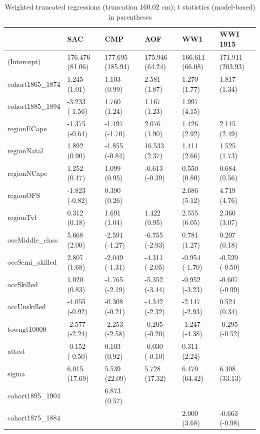 \begin{table}

\caption{Weighted truncated regressions (truncation 160.02 cm); t statistics (model-based) in parentheses}
\centering
\begin{tabular}[t]{llllll}
\toprule
 & SAC & CMP & AOF & WW1 & WWI 1915\\
\midrule
(Intercept) & 176.476 (81.06) & 177.695 (185.94) & 175.946 (64.24) & 166.611 (66.08) & 171.911 (203.93)\\
cohort1865\_1874 & 1.245 (1.01) & 1.103 (0.99) & 2.581 (1.87) & 1.270 (1.77) & 1.817 (1.34)\\
cohort1885\_1894 & -3.233 (-1.56) & 1.760 (1.24) & 1.167 (1.23) & 1.997 (4.15) & \\
regionECape & -1.375 (-0.64) & -1.497 (-1.70) & 2.076 (1.90) & 1.426 (2.92) & 2.145 (2.49)\\
regionNatal & 1.892 (0.90) & -1.855 (-0.84) & 16.533 (2.37) & 1.411 (2.66) & 1.525 (1.73)\\
\addlinespace
regionNCape & 1.252 (0.47) & 1.099 (0.95) & -0.613 (-0.39) & 0.550 (0.80) & 0.684 (0.56)\\
regionOFS & -1.823 (-0.82) & 0.390 (0.26) &  & 2.686 (5.12) & 4.719 (4.76)\\
regionTvl & 0.312 (0.18) & 1.691 (1.04) & 1.422 (0.95) & 2.555 (6.05) & 2.360 (3.07)\\
occMiddle\_class & 5.668 (2.00) & -2.591 (-1.27) & -6.755 (-2.93) & 0.781 (1.27) & 0.207 (0.18)\\
occSemi\_skilled & 2.807 (1.68) & -2.049 (-1.31) & -4.311 (-2.05) & -0.954 (-1.70) & -0.520 (-0.50)\\
\addlinespace
occSkilled & 1.020 (0.83) & -1.765 (-2.19) & -5.352 (-3.44) & -0.952 (-3.23) & -0.607 (-0.99)\\
occUnskilled & -4.055 (-0.92) & -0.308 (-0.21) & -4.342 (-2.32) & -2.147 (-2.93) & 0.524 (0.34)\\
towngt10000 & -2.577 (-2.24) & -2.253 (-2.58) & -0.205 (-0.20) & -1.247 (-4.38) & -0.295 (-0.52)\\
attest & -0.152 (-0.50) & 0.103 (0.92) & -0.030 (-0.10) & 0.311 (2.24) & \\
sigma & 6.015 (17.69) & 5.539 (22.09) & 5.728 (17.32) & 6.470 (64.42) & 6.408 (33.13)\\
\addlinespace
cohort1895\_1904 &  & 6.873 (0.57) &  &  & \\
cohort1875\_1884 &  &  &  & 2.000 (3.68) & -0.663 (-0.98)\\
\bottomrule
\end{tabular}
\end{table}
